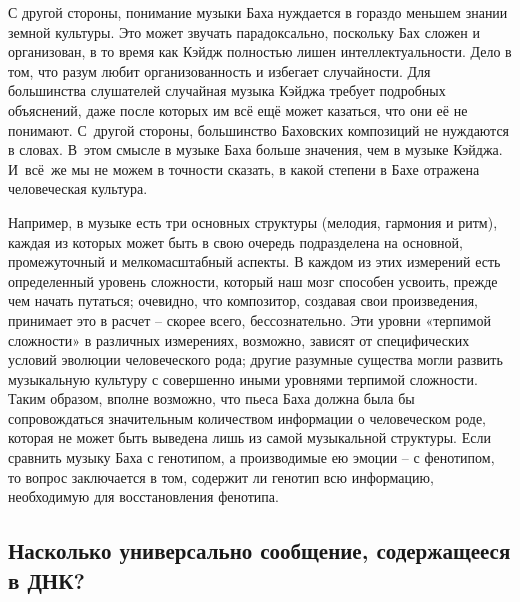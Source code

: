 \documentclass[../main.tex]{subfiles}
\begin{document}
С другой стороны, понимание музыки Баха нуждается в гораздо меньшем знании земной культуры. Это может звучать парадоксально, поскольку Бах сложен и организован, в то время как Кэйдж полностью лишен интеллектуальности. Дело в том, что разум любит организованность и избегает случайности. Для большинства слушателей случайная музыка Кэйджа требует подробных объяснений, даже после которых им всё ещё может казаться, что они её не понимают. С~другой стороны, большинство Баховских композиций не нуждаются в словах. В~этом смысле в музыке Баха больше значения, чем в музыке Кэйджа. И~всё~же мы не можем в точности сказать, в какой степени в Бахе отражена человеческая культура.

Например, в музыке есть три основных структуры (мелодия, гармония и ритм), каждая из которых может быть в свою очередь подразделена на основной, промежуточный и мелкомасштабный аспекты. В каждом из этих измерений есть определенный уровень сложности, который наш мозг способен усвоить, прежде чем начать путаться; очевидно, что композитор, создавая свои произведения, принимает это в расчет \--- скорее всего, бессознательно. Эти уровни «терпимой сложности» в различных измерениях, возможно, зависят от специфических условий эволюции человеческого рода; другие разумные существа могли развить музыкальную культуру с совершенно иными уровнями терпимой сложности. Таким образом, вполне возможно, что пьеса Баха должна была бы сопровождаться значительным количеством информации о человеческом роде, которая не может быть выведена лишь из самой музыкальной структуры. Если сравнить музыку Баха с генотипом, а производимые ею эмоции \--- с фенотипом, то вопрос заключается в том, содержит ли генотип всю информацию, необходимую для восстановления фенотипа.


\subsection{Насколько универсально сообщение, содержащееся в ДНК?}
\end{document}
